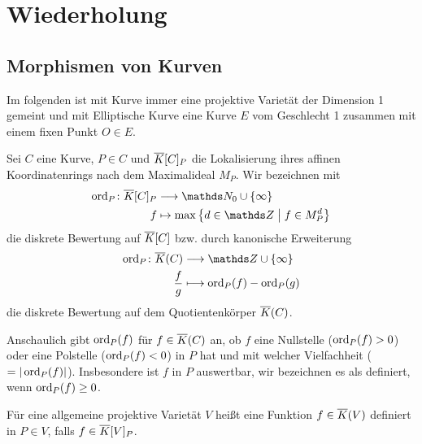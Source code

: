 \section{Wiederholung}
\subsection{Morphismen von Kurven}
Im folgenden ist mit Kurve immer eine projektive Varietät der
Dimension 1 gemeint und mit Elliptische Kurve eine Kurve $E$ vom
Geschlecht 1 zusammen mit einem fixen Punkt $O\in E$.

\begin{Definition}[Definiertheit]
  Sei $C$ eine Kurve, $P\in C$ und $\overline K[C]_P$ die Lokalisierung
  ihres affinen Koordinatenrings nach dem Maximalideal $M_P$.
  Wir bezeichnen mit
  \begin{align*}
    \ord_P\colon \algK[C]_P &\longto \N_0 \cup \{\infty\} \\
    f &\mapsto \max\left\{d\in\Z\;\middle|\; f\in M_P^d \right\}
  \end{align*}
  die diskrete Bewertung auf $\overline K[C]$ bzw. durch kanonische
  Erweiterung
  \begin{align*}
    \ord_P\colon \algK(C) &\longto \Z \cup \{\infty\} \\
    \frac{f}{g} &\longmapsto \ord_P(f) - \ord_P(g)
  \end{align*}
  die diskrete Bewertung auf dem Quotientenkörper $\overline K(C)$.

  Anschaulich gibt $\operatorname{ord}_P(f)$ für $f\in\overline K(C)$ an, ob $f$
  eine Nullstelle ($\operatorname{ord}_P(f)>0$) oder eine Polstelle ($\operatorname{ord}_P(f)<0$)
  in $P$ hat und mit welcher Vielfachheit ($=|\operatorname{ord}_P(f)|$).
  Insbesondere ist $f$ in $P$ auswertbar, wir bezeichnen es als
  definiert, wenn $\operatorname{ord}_P(f)\geq 0$.

  Für eine allgemeine projektive Varietät $V$ heißt eine Funktion
  $f\in\overline K(V)$ definiert in $P\in V$, falls $f\in\overline K[V]_P$.
\end{Definition}

